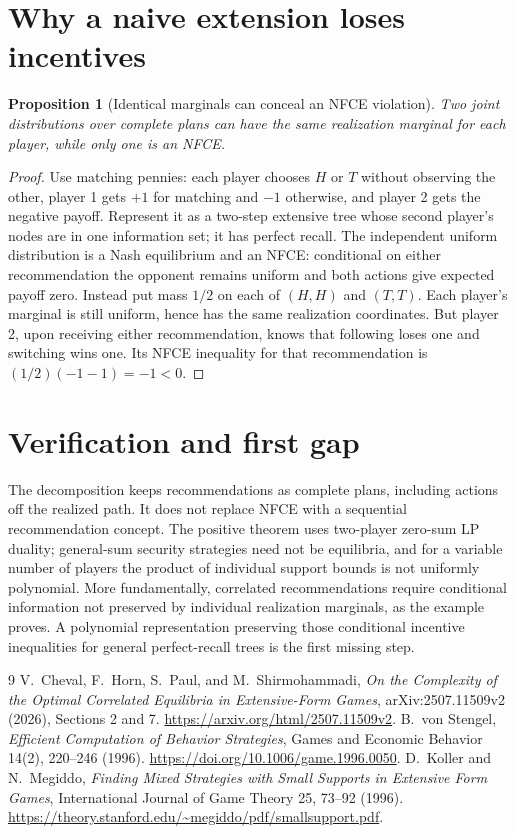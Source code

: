 \documentclass[11pt]{article}
\newtheorem{proposition}[theorem]{Proposition}
\theoremstyle{definition}
\begin{document}
\section{Why a naive extension loses incentives}
\begin{proposition}[Identical marginals can conceal an NFCE violation]
Two joint distributions over complete plans can have the same realization
marginal for each player, while only one is an NFCE.
\end{proposition}
\begin{proof}
Use matching pennies: each player chooses $H$ or $T$ without observing the
other, player 1 gets $+1$ for matching and $-1$ otherwise, and player 2 gets
the negative payoff. Represent it as a two-step extensive tree whose second
player's nodes are in one information set; it has perfect recall.
The independent uniform distribution is a Nash equilibrium and an NFCE:
conditional on either recommendation the opponent remains uniform and both
actions give expected payoff zero. Instead put mass $1/2$ on each of
$(H,H)$ and $(T,T)$. Each player's marginal is still uniform, hence has the
same realization coordinates. But player 2, upon receiving either recommendation,
knows that following loses one and switching wins one. Its NFCE inequality
for that recommendation is $(1/2)(-1-1)=-1<0$.
\end{proof}

\section{Verification and first gap}
The decomposition keeps recommendations as complete plans, including actions
off the realized path. It does not replace NFCE with a sequential recommendation
concept. The positive theorem uses two-player zero-sum LP duality; general-sum
security strategies need not be equilibria, and for a variable number of
players the product of individual support bounds is not uniformly polynomial.
More fundamentally, correlated recommendations require conditional information
not preserved by individual realization marginals, as the example proves.
A polynomial representation preserving those conditional incentive inequalities
for general perfect-recall trees is the first missing step.

\begin{thebibliography}{9}
 V.~Cheval, F.~Horn, S.~Paul, and M.~Shirmohammadi,
\emph{On the Complexity of the Optimal Correlated Equilibria in Extensive-Form
Games}, arXiv:2507.11509v2 (2026), Sections 2 and 7.
\url{https://arxiv.org/html/2507.11509v2}.
 B.~von Stengel, \emph{Efficient Computation of Behavior
Strategies}, Games and Economic Behavior 14(2), 220--246 (1996).
\url{https://doi.org/10.1006/game.1996.0050}.
 D.~Koller and N.~Megiddo, \emph{Finding Mixed Strategies
with Small Supports in Extensive Form Games}, International Journal of Game
Theory 25, 73--92 (1996).
\url{https://theory.stanford.edu/~megiddo/pdf/smallsupport.pdf}.
\end{thebibliography}
\end{document}
